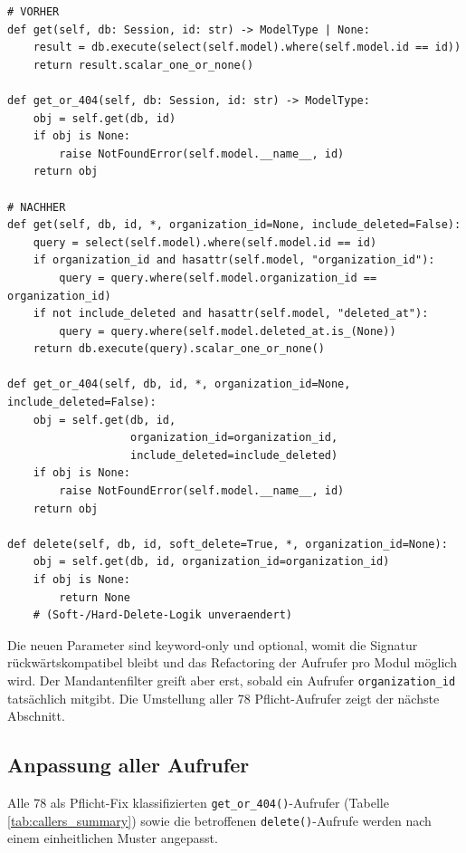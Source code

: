 \begin{lstlisting}[style=custompython, caption={base.py \textendash{} gepatchte Methoden get(), get\_or\_404() und delete()}]
# VORHER
def get(self, db: Session, id: str) -> ModelType | None:
    result = db.execute(select(self.model).where(self.model.id == id))
    return result.scalar_one_or_none()

def get_or_404(self, db: Session, id: str) -> ModelType:
    obj = self.get(db, id)
    if obj is None:
        raise NotFoundError(self.model.__name__, id)
    return obj

# NACHHER
def get(self, db, id, *, organization_id=None, include_deleted=False):
    query = select(self.model).where(self.model.id == id)
    if organization_id and hasattr(self.model, "organization_id"):
        query = query.where(self.model.organization_id == organization_id)
    if not include_deleted and hasattr(self.model, "deleted_at"):
        query = query.where(self.model.deleted_at.is_(None))
    return db.execute(query).scalar_one_or_none()

def get_or_404(self, db, id, *, organization_id=None, include_deleted=False):
    obj = self.get(db, id,
                   organization_id=organization_id,
                   include_deleted=include_deleted)
    if obj is None:
        raise NotFoundError(self.model.__name__, id)
    return obj

def delete(self, db, id, soft_delete=True, *, organization_id=None):
    obj = self.get(db, id, organization_id=organization_id)
    if obj is None:
        return None
    # (Soft-/Hard-Delete-Logik unveraendert)
\end{lstlisting}

Die neuen Parameter sind keyword-only und optional, womit die
Signatur rückwärtskompatibel bleibt und das Refactoring der Aufrufer
pro Modul möglich wird. Der Mandantenfilter greift aber erst, sobald
ein Aufrufer \texttt{organization\_id} tatsächlich mitgibt. Die
Umstellung aller 78 Pflicht-Aufrufer zeigt der nächste Abschnitt.

\subsection{Anpassung aller Aufrufer}
\label{sec:patch-callers}

Alle 78 als Pflicht-Fix klassifizierten
\texttt{get\_or\_404()}-Aufrufer (Tabelle \ref{tab:callers_summary})
sowie die betroffenen \texttt{delete()}-Aufrufe werden nach einem
einheitlichen Muster angepasst.


